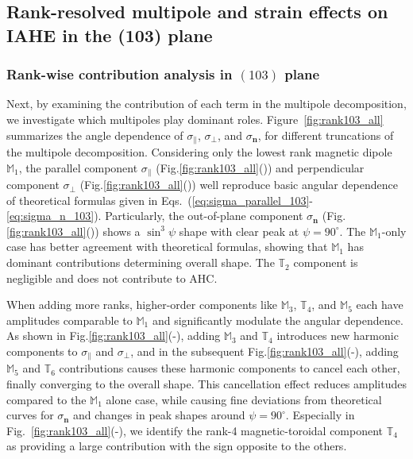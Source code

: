 \documentclass[preprint,12pt]{elsarticle}
\begin{document}
\subsection{Rank-resolved multipole and strain effects on IAHE in the
(103) plane}

\subsubsection{Rank-wise contribution analysis in $(103)$ plane}
Next, by examining the contribution of each term in the multipole
decomposition, we investigate which multipoles play dominant roles.
Figure~\ref{fig:rank103_all} summarizes the angle dependence of
$\sigma_\parallel$, $\sigma_\perp$, and $\sigma_{\bm n}$, for
different truncations of the multipole decomposition.
Considering only the lowest rank magnetic dipole $\mathbb{M}_1$,
the parallel component $\sigma_\parallel$
(Fig.\ref{fig:rank103_all}()) and
perpendicular component $\sigma_\perp$
(Fig.\ref{fig:rank103_all}()) well
reproduce basic angular dependence of theoretical formulas given in
Eqs.~(\ref{eq:sigma_parallel_103}-\ref{eq:sigma_n_103}).
Particularly, the out-of-plane component $\sigma_{\bm n}$
(Fig.\ref{fig:rank103_all}()) shows
a $\sin^3\psi$ shape with clear peak at $\psi=90^{\circ}$.
The $\mathbb{M}_1$-only case has better agreement with theoretical
formulas, showing that $\mathbb{M}_1$ has dominant contributions
determining overall shape.
The $\mathbb{T}_2$ component is negligible and does not contribute to AHC.

When adding more ranks, higher-order components like $\mathbb{M}_3$,
$\mathbb{T}_4$, and $\mathbb{M}_5$ each have amplitudes comparable to
$\mathbb{M}_1$ and significantly modulate the angular dependence.
As shown in
Fig.\ref{fig:rank103_all}(-),
adding $\mathbb{M}_3$ and
$\mathbb{T}_4$ introduces new harmonic components to
$\sigma_\parallel$ and $\sigma_\perp$, and in the subsequent
Fig.\ref{fig:rank103_all}(-),
adding $\mathbb{M}_5$ and
$\mathbb{T}_6$ contributions causes these harmonic components to
cancel each other, finally converging to the overall shape.
This cancellation effect reduces amplitudes compared to the
$\mathbb{M}_1$ alone case, while causing fine deviations from theoretical
curves for $\sigma_{\bm n}$ and changes in peak shapes around $\psi=90^{\circ}$.
Especially in
Fig.~\ref{fig:rank103_all}(-),
we identify the rank-4 magnetic-toroidal component $\mathbb{T}_4$ as
providing a large contribution with the sign opposite to the others.
\end{document}
